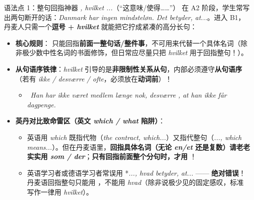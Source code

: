 \begin{grammatikbox}{语法点 1：整句回指神器 \textit{, hvilket ...}（“这意味/使得……”）}
在 A2 阶段，学生常写出两句断开的话：\textit{Danmark har ingen mindsteløn. Det betyder, at...}。进入 B1，丹麦人只需一个\textbf{逗号 + \textit{hvilket}} 就能把它拧成紧凑的高分长句：
\begin{itemize}
  \item \textbf{核心规则}： 只能回指\textbf{前面一整句话/整件事}，不可用来代替一个具体名词（除非极少数中性名词的书面修饰，但日常应尽量只把 \textit{hvilket} 用于回指整句！）。
  \item \textbf{从句语序铁律}：\textit{hvilket} 引导的是\textbf{非限制性关系从句}，内部必须遵守\textbf{从句语序}（若有 \textit{ikke / desværre / ofte}，必须放在\textbf{动词前}）！
  \begin{itemize}
    \item {}\ \textit{Han har ikke været medlem længe nok,  desværre , at han ikke får dagpenge.}
  \end{itemize}
  \item \textbf{英丹对比致命雷区（英文 \textit{which / what} 陷阱）}：
    \begin{itemize}
      \item 英语用 \textit{which} 既指代物（\textit{the contract, which...}）又指代整句（\textit{..., which means...}）。但在丹麦语里，\textbf{回指具体名词（无论 \textit{en/et} 还是复数）请老老实实用 \textit{som / der}}；\textbf{只有回指前面整个分句时，才用 }！
      \item 英语学习者或德语学习者常误用 *\textit{..., hvad betyder, at...} —— \textbf{绝对错误}！丹麦语回指整句只能用 ，不能用 \textit{hvad}（除非说极少见的固定感叹，标准写作一律用 \textit{hvilket}）。
    \end{itemize}
\end{itemize}
\end{grammatikbox}

